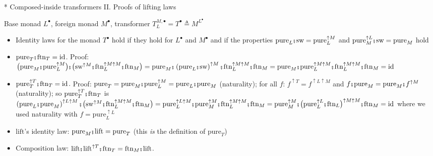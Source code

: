 \documentclass[english]{beamer}
\newcommand{\bef}{\hspace{0.5pt}\ensuremath\mathsmaller{\fatsemi}\hspace{1.5pt}}
\begin{document}
\begin{frame}{{*} Composed-inside transformers II. Proofs of lifting laws}

{\footnotesize{}\vspace{-0.15cm}}Base monad $L^{\bullet}$, foreign
monad $M^{\bullet}$, transformer $T_{L}^{M,\bullet}=T^{\bullet}\triangleq M^{L^{\bullet}}$
\begin{itemize}
\item Identity laws for the monad $T^{\bullet}$ hold if they hold for $L^{\bullet}$
and $M^{\bullet}$ and if the properties $\text{pure}_{L}\bef\text{sw}=\text{pure}_{L}^{\uparrow M}$
and $\text{pure}_{M}^{\uparrow L}\bef\text{sw}=\text{pure}_{M}$ hold
\item $\text{pure}_{T}\bef\text{ftn}_{T}=\text{id}$. {\footnotesize{}Proof:
$\big(\text{pure}_{M}\bef\text{pure}_{L}^{\uparrow M}\big)\bef\big(\text{sw}^{\uparrow M}\bef\text{ftn}_{L}^{\uparrow M\uparrow M}\bef\text{ftn}_{M}\big)=\text{pure}_{M}\bef\left(\text{pure}_{L}\bef\text{sw}\right)^{\uparrow M}\bef\text{ftn}_{L}^{\uparrow M\uparrow M}\bef\text{ftn}_{M}=\text{pure}_{M}\bef\text{pure}_{L}^{\uparrow M\uparrow M}\bef\text{ftn}_{L}^{\uparrow M\uparrow M}\bef\text{ftn}_{M}=\text{id}$}{\footnotesize\par}
\item $\text{pure}_{T}^{\uparrow T}\bef\text{ftn}_{T}=\text{id}$. {\footnotesize{}Proof:
$\text{pure}_{T}=\text{pure}_{M}\bef\text{pure}_{L}^{\uparrow M}=\text{pure}_{L}\bef\text{pure}_{M}$
(naturality); for all $f$: $f^{\uparrow T}=f^{\uparrow L\uparrow M}$
and $f\bef\text{pure}_{M}=\text{pure}_{M}\bef f^{\uparrow M}$ (naturality);
so $\text{pure}_{T}^{\uparrow T}\bef\text{ftn}_{T}$ is $\left(\text{pure}_{L}\bef\text{pure}_{M}\right)^{\uparrow L\uparrow M}\bef\big(\text{sw}^{\uparrow M}\bef\text{ftn}_{L}^{\uparrow M\uparrow M}\bef\text{ftn}_{M}\big)=\text{pure}_{L}^{\uparrow L\uparrow M}\bef\text{pure}_{M}^{\uparrow M}\bef\text{ftn}_{L}^{\uparrow M\uparrow M}\bef\text{ftn}_{M}=\text{pure}_{M}^{\uparrow M}\bef\big(\text{pure}_{L}^{\uparrow L}\bef\text{ftn}_{L}\big)^{\uparrow M\uparrow M}\bef\text{ftn}_{M}=\text{id}$
where we used naturality with $f=\text{pure}_{L}^{\uparrow L}$}{\footnotesize\par}
\item $\text{lift}$'s identity law: $\text{pure}_{M}\bef\text{lift}=\text{pure}_{T}$
{\footnotesize{}(this }\emph{\footnotesize{}is}{\footnotesize{} the
definition of $\text{pure}_{T}$)}{\footnotesize\par}
\item Composition law: $\text{lift}\bef\text{lift}^{\uparrow T}\bef\text{ftn}_{T}=\text{ftn}_{M}\bef\text{lift}$.

\end{itemize}
\end{frame}
\end{document}

